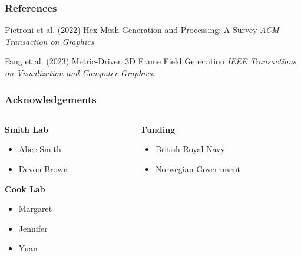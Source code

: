 \documentclass[
	11pt, %
	aspectratio=169, %
]{beamer}
\begin{document}
\begin{frame} %
	\frametitle{References}
	
	\begin{thebibliography}{99} %
		\footnotesize %
		
			Pietroni et al. (2022)
			\newblock Hex-Mesh Generation and Processing: A Survey
			\newblock \emph{ACM Transaction on Graphics}
			
			Fang et al. (2023)
			\newblock Metric-Driven 3D Frame Field Generation
			\newblock \emph{IEEE Transactions on Visualization and Computer Graphics}.
	\end{thebibliography}
\end{frame}


\begin{frame}
	\frametitle{Acknowledgements}
	
	\begin{columns}[t] %
		\begin{column}{0.45\textwidth} %
			\textbf{Smith Lab}
			\begin{itemize}
				\item Alice Smith
				\item Devon Brown
			\end{itemize}
			\textbf{Cook Lab}
			\begin{itemize}
				\item Margaret
				\item Jennifer
				\item Yuan
			\end{itemize}
		\end{column}		
		\begin{column}{0.5\textwidth} %
			\textbf{Funding}
			\begin{itemize}
				\item British Royal Navy
				\item Norwegian Government
			\end{itemize}
		\end{column}
	\end{columns}
\end{frame}
\end{document}
